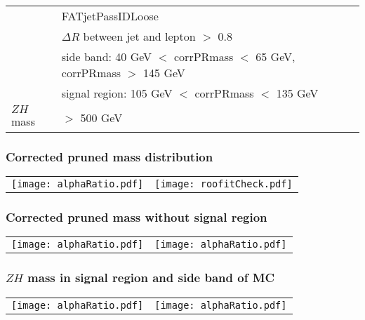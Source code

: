 \documentclass[aspectratio=169]{beamer}
\begin{document}
\begin{frame}
\begin{tiny}
\begin{center}
\begin{tabular}[t]{ | l | l | }
        & FATjetPassIDLoose                              \\
        & $\Delta R$ between jet and lepton $>$ 0.8      \\
        & side band: 40 GeV $<$ corrPRmass $<$ 65 GeV, corrPRmass $>$ 145 GeV \\
        & signal region: 105 GeV $<$ corrPRmass $<$ 135 GeV \\
        \hline
        $ZH$ mass                 
        & $>$ 500 GeV                                    \\
        \hline      
      \end{tabular}
    \end{center}   
  \end{tiny}
\end{frame}
\begin{frame}
  \frametitle{Corrected pruned mass distribution}
  \begin{center}
    \begin{tabular}{ll}
    \texttt{[image: alphaRatio.pdf]}  &
    \texttt{[image: roofitCheck.pdf]} \\
    \end{tabular}
  \end{center}
\end{frame}
\begin{frame}
  \frametitle{Corrected pruned mass without signal region}
  \begin{center}
    \begin{tabular}{ll}
      \texttt{[image: alphaRatio.pdf]} &
      \texttt{[image: alphaRatio.pdf]} \\
    \end{tabular}
  \end{center}
\end{frame}
\begin{frame}
  \frametitle{$ZH$ mass in signal region and side band of MC}
  \begin{center}
    \begin{tabular}{ll}
      \texttt{[image: alphaRatio.pdf]} &
      \texttt{[image: alphaRatio.pdf]} \\
    \end{tabular}
  \end{center}
\end{frame}
\end{document}
